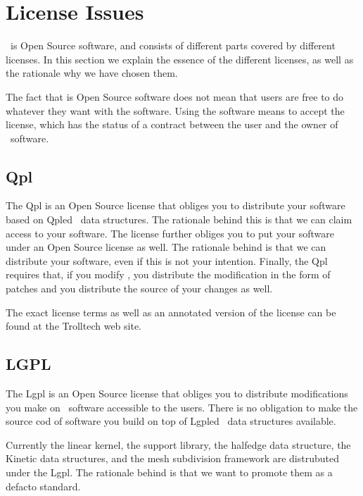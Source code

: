 
\section{License Issues}

\cgal\ is Open Source software, and consists of different parts covered by different licenses.
In this section we explain the essence of the different licenses, as well as the rationale
why we have chosen them. 

The fact that \cgal is Open Source software does not mean that users are free to do whatever they
want with the software. Using the software means to accept the license,
which has the status of a contract between the user and the owner of \cgal\ software.


\subsection{Qpl \label{licenses:QPL}}

The {\sc Qpl} is an Open Source license that obliges you to distribute your software 
based on {\sc Qpl}ed \cgal\ data structures.  The rationale behind this is that we
can claim access to your software.  The license further obliges you to put your
software under an Open Source license as well. The rationale behind is that
we can distribute your software, even if this is not your intention.  
Finally, the {\sc Qpl} requires that, if you modify \cgal, you distribute the
modification in the form of patches and you distribute the source of your changes
as well.


The exact license terms as well as an annotated version of the license can be found 
at the Trolltech web site.

\subsection{LGPL \label{licenses:LGPL}}

The {\sc Lgpl} is an Open Source license that obliges you to distribute modifications
you make on \cgal\ software accessible to the users. There is no obligation to make
the source cod of software you build on top of {\sc Lgpl}ed \cgal\ data structures available.

Currently the linear kernel, the support library, the halfedge data structure,
the Kinetic data structures, and the mesh subdivision framework are distrubuted
under the {\sc Lgpl}. The rationale behind is that we want to promote them as a defacto
standard.

